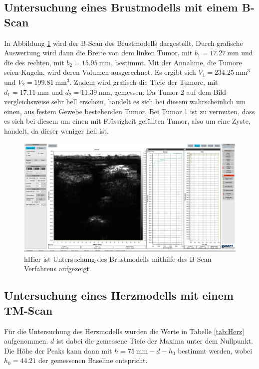 \subsection{Untersuchung eines Brustmodells mit einem B-Scan}

In Abbildung \ref{fig:Brust} wird der B-Scan des Brustmodells dargestellt.
Durch grafische Auswertung wird dann die Breite von dem linken Tumor, mit $b_1=\qty{17.27}{\milli\meter}$ und die des rechten, mit $b_2=\qty{15.95}{\milli\meter}$, bestimmt.
Mit der Annahme, die Tumore seien Kugeln, wird deren Volumen ausgerechnet.
Es ergibt sich $V_1=\qty{234.25}{\milli\meter\cubed}$ und $V_2=\qty{199.81}{\milli\meter\cubed}$.
Zudem wird grafisch die Tiefe der Tumore, mit $d_1=\qty{17.11}{\milli\meter}$ und $d_2=\qty{11.39}{\milli\meter}$, gemessen.
Da Tumor 2 auf dem Bild vergleichsweise sehr hell erschein, handelt es sich bei diesem wahrscheinlich um einen, aus festem Gewebe bestehenden Tumor.
Bei Tumor 1 ist zu vermuten, dass es sich bei diesem um einen mit Flüssigkeit gefüllten Tumor, also um eine Zyste, handelt, da dieser weniger hell ist. 

\begin{figure}
  \centering
  \includegraphics[width=\textwidth]{Bilder/Brust6.jpg}
  \caption{hHier ist Untersuchung des Brustmodells mithilfe des B-Scan Verfahrens aufgezeigt.}
  \label{fig:Brust}
\end{figure}

\subsection{Untersuchung eines Herzmodells mit einem TM-Scan}

Für die Untersuchung des Herzmodells wurden die Werte in Tabelle \ref{tab:Herz} aufgenommen.
$d$ ist dabei die gemessene Tiefe der Maxima unter dem Nullpunkt. 
Die Höhe der Peaks kann dann mit $h=\qty{75}{\milli\meter}-d-h_0$ bestimmt werden, wobei $h_0=44.21$ der gemessenen Baseline entspricht.

